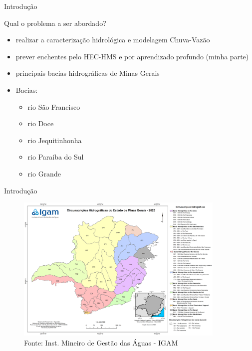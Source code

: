 \begin{frame}{Introdução}
    \begin{block}{Qual o problema a ser abordado?}
        \begin{itemize}
            \item realizar a caracterização hidrológica e modelagem Chuva-Vazão
            \item prever enchentes pelo HEC-HMS e por aprendizado profundo (minha parte)
            \item principais bacias hidrográficas de Minas Gerais
            \item Bacias:
            \begin{itemize}
               \item rio São Francisco
               \item rio Doce
               \item rio Jequitinhonha
               \item rio Paraíba do Sul
               \item rio Grande
            \end{itemize}
        \end{itemize}
    \end{block}
\end{frame}

\begin{frame}{Introdução}
    \begin{figure}
        \centering
        \includegraphics[width=10cm]{img/bacias.png} \\
        Fonte: Inst. Mineiro de Gestão das Águas - IGAM
        \label{fig:bacias}
    \end{figure}
\end{frame}
